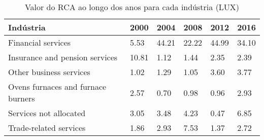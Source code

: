 \begin{table}
\centering
\caption{Valor do RCA ao longo dos anos para cada indústria (LUX)}
\label{tab:ex3-tempo-LUX}
\begin{tabular}{p{6cm}p{1.5cm}p{1.5cm}p{1.5cm}p{1.5cm}p{1.5cm}}
\toprule
                         Indústria &  2000 &  2004 &  2008 &  2012 &  2016 \\
\midrule
                Financial services &  5.53 & 44.21 & 22.22 & 44.99 & 34.10 \\
    Insurance and pension services & 10.81 &  1.12 &  1.44 &  2.35 &  2.39 \\
           Other business services &  1.02 &  1.29 &  1.05 &  3.60 &  3.77 \\
Ovens furnaces and furnace burners &  2.57 &  0.70 &  0.98 &  0.96 &  2.93 \\
            Services not allocated &  3.05 &  3.48 &  4.23 &  0.47 &  6.85 \\
            Trade-related services &  1.86 &  2.93 &  7.53 &  1.37 &  2.72 \\
\bottomrule
\end{tabular}
\end{table}

